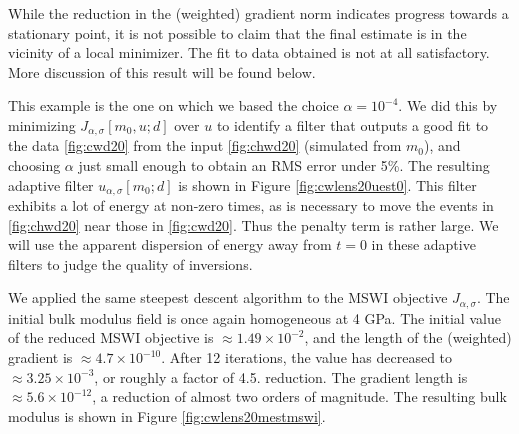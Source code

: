 

While the reduction in the (weighted) gradient norm indicates progress
towards a stationary point, it is not possible to claim that the final
estimate is in the vicinity of a local minimizer. The fit to data
obtained is not at all satisfactory. More discussion of this result
will be found below.

This example is the one on which we based the choice $\alpha =
10^{-4}$. We did this by minimizing $J_{\alpha,\sigma}[m_0, u; d]$
over $u$ to identify a filter that outputs a good fit to the data
\ref{fig:cwd20} from the input \ref{fig:chwd20} (simulated from
$m_0$), and choosing $\alpha$ just small enough to obtain an RMS error
under 5\%.  The resulting adaptive filter $u_{\alpha,\sigma}[m_0;d]$
is shown in Figure \ref{fig:cwlens20uest0}. This filter exhibits a lot
of energy at non-zero times, as is necessary to move the events in
\ref{fig:chwd20} near those in \ref{fig:cwd20}. Thus the penalty term
is rather large. We will use the apparent dispersion of energy away
from $t=0$ in these adaptive filters to judge the quality of
inversions.


We applied the same steepest descent algorithm to the MSWI objective
$J_{\alpha,\sigma}$. The initial bulk modulus field is once again
homogeneous at 4 GPa. The initial value of the reduced MSWI objective
is $\approx 1.49 \times 10^{-2}$, and the length of the (weighted)
gradient is $\approx 4.7 \times 10^{-10}$. After 12 iterations, the value has
decreased to $\approx 3.25 \times 10^{-3}$, or roughly a factor of 4.5.
reduction. The gradient length is
$\approx 5.6 \times 10^{-12}$, a reduction of almost two orders of
magnitude. The resulting bulk modulus is shown in Figure
\ref{fig:cwlens20mestmswi}.


